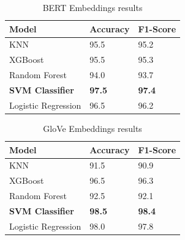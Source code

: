 \begin{table}[hbt!]
\begin{threeparttable}
\caption{BERT Embeddings results}
\label{bert_embeddings_results}
\begin{tabular}{lll}
\toprule
\headrow Model & Accuracy & F1-Score\\
\midrule
 KNN                 &       95.5 &       95.2 \\
 XGBoost             &       95.5 &       95.3 \\
 Random Forest       &       94.0 &       93.7 \\
 \textbf{SVM Classifier}      &       \textbf{97.5} &       \textbf{97.4} \\
 Logistic Regression &       96.5 &       96.2 \\
\bottomrule
\end{tabular}
\end{threeparttable}
\end{table}

\begin{table}[hbt!]
\begin{threeparttable}
\caption{GloVe Embeddings results}
\label{glove_embeddings_results}
\begin{tabular}{lll}
\toprule
\headrow Model & Accuracy & F1-Score\\
\midrule
 KNN                 &       91.5 &       90.9 \\
 XGBoost             &       96.5 &       96.3 \\
 Random Forest       &       92.5 &       92.1 \\
 \textbf{SVM Classifier}      &       \textbf{98.5} &       \textbf{98.4} \\
 Logistic Regression &       98.0 &       97.8 \\
\bottomrule
\end{tabular}
\end{threeparttable}
\end{table}


